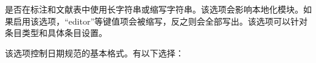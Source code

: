\begin{optionlist}

是否在标注和文献表中使用长字符串或缩写字符串。该选项会影响本地化模块。如果启用该选项，“editor”等键值项会被缩写，反之则会全部写出。该选项可以针对条目类型和具体条目设置。



该选项控制日期规范的基本格式。有以下选择：


\end{optionlist}
